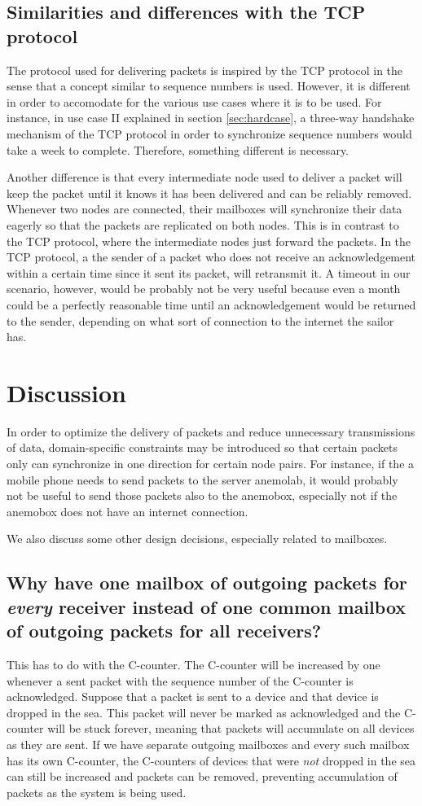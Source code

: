 \documentclass{article}
\begin{document}
\subsection{Similarities and differences with the TCP protocol}
The protocol used for delivering packets is inspired by the TCP protocol in the sense that a concept similar to sequence numbers is used. However, it is different in order to accomodate for the various use cases where it is to be used. For instance, in use case II explained in section \ref{sec:hardcase}, a three-way handshake mechanism of the TCP protocol in order to synchronize sequence numbers would take a week to complete. Therefore, something different is necessary.

Another difference is that every intermediate node used to deliver a packet will keep the packet until it knows it has been delivered and can be reliably removed. Whenever two nodes are connected, their mailboxes will synchronize their data eagerly so that the packets are replicated on both nodes. This is in contrast to the TCP protocol, where the intermediate nodes just forward the packets. In the TCP protocol, a the sender of a packet who does not receive an acknowledgement within a certain time since it sent its packet, will retransmit it. A timeout in our scenario, however, would be probably not be very useful because even a month could be a perfectly reasonable time until an acknowledgement would be returned to the sender, depending on what sort of connection to the internet the sailor has.

\section{Discussion}
In order to optimize the delivery of packets and reduce unnecessary transmissions of data, domain-specific constraints may be introduced so that certain packets only can synchronize in one direction for certain node pairs. For instance, if the a mobile phone needs to send packets to the server anemolab, it would probably not be useful to send those packets also to the anemobox, especially not if the anemobox does not have an internet connection.

We also discuss some other design decisions, especially related to mailboxes.

\subsection{Why have one mailbox of outgoing packets for \emph{every} receiver instead of one common mailbox of outgoing packets for all receivers?}
This has to do with the C-counter. The C-counter will be increased by one whenever a sent packet with the sequence number of the C-counter is acknowledged. Suppose that a packet is sent to a device and that device is dropped in the sea. This packet will never be marked as acknowledged and the C-counter will be stuck forever, meaning that packets will accumulate on all devices as they are sent. If we have separate outgoing mailboxes and every such mailbox has its own C-counter, the C-counters of devices that were \emph{not} dropped in the sea can still be increased and packets can be removed, preventing accumulation of packets as the system is being used.
\end{document}
